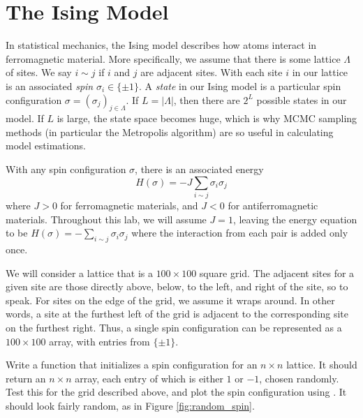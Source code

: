 \section*{The Ising Model}
In statistical mechanics, the Ising model describes how atoms interact in ferromagnetic material. More specifically, we assume that there is some lattice $\Lambda$ of sites. We say $i \sim j$ if $i$ and $j$ are adjacent sites. With each site $i$ in our lattice is an associated \emph{spin} $\sigma_{i} \in \{\pm 1\}$. A \emph{state} in our Ising model is a particular spin configuration $\sigma = (\sigma_{j})_{j \in \Lambda}$. If $L = |\Lambda|$, then there are $2^{L}$ possible states in our model. If $L$ is large, the state space becomes huge, which is why MCMC sampling methods (in particular the Metropolis algorithm) are so useful in calculating model estimations.

With any spin configuration $\sigma$, there is an associated energy 
\[
H(\sigma) = -J \sum_{i \sim j} \sigma_{i} \sigma_{j}
\]
 where $J > 0$ for ferromagnetic materials, and $J < 0$ for antiferromagnetic materials. Throughout this lab, we will assume $J = 1$, leaving the energy equation to be $H(\sigma) = -\sum_{i \sim j} \sigma_{i}\sigma_{j}$ where the interaction from each pair is added only once.

We will consider a lattice that is a $100 \times 100$ square grid. The adjacent sites for a given site are those directly above, below, to the left, and right of the site, so to speak. For sites on the edge of the grid, we assume it wraps around. In other words, a site at the furthest left of the grid is adjacent to the corresponding site on the furthest right. Thus, a single spin configuration can be represented as a $100 \times 100$ array, with entries from $\{\pm 1\}$.

\begin{problem}
Write a function that initializes a spin configuration for an $n \times n$ lattice. It should return an $n \times n$ array, each entry of which is either $1$ or $-1$, chosen randomly. Test this for the grid described above, and plot the spin configuration using . It should look fairly random, as in Figure \ref{fig:random_spin}.
\end{problem}

